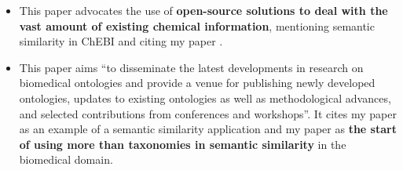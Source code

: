 \begin{refsection}
\end{refsection}
\nobreakhere
\begin{itemize}
    \vspace{\topsep}
    \item This paper advocates the use of \textbf{open-source solutions to deal with the vast amount of existing chemical information}, mentioning semantic similarity in ChEBI and citing my paper \autocite{Ferreira2010}.
\end{itemize}

\begin{refsection}
\end{refsection}
\begin{itemize}
    \item This paper aims ``to disseminate the latest developments in research on biomedical ontologies and provide a venue for publishing newly developed ontologies, updates to existing ontologies as well as methodological advances, and selected contributions from conferences and workshops''. It cites my paper \autocite{Ferreira2010} as an example of a semantic similarity application and my paper \autocite{Ferreira2013} as \textbf{the start of using more than taxonomies in semantic similarity} in the biomedical domain.
\end{itemize}




